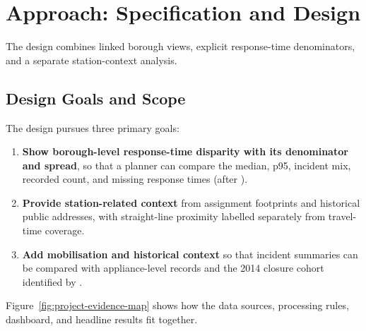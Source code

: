 \section{Approach: Specification and Design}

The design combines linked borough views, explicit response-time denominators, and a separate station-context analysis.

\subsection{Design Goals and Scope}

The design pursues three primary goals:

\begin{enumerate}
    \item \textbf{Show borough-level response-time disparity with its denominator and spread}, so that a planner can compare the median, p95, incident mix, recorded count, and missing response times (after \cite{hullman2015hops, maceachren2012, padilla2018}).
    \item \textbf{Provide station-related context} from assignment footprints and historical public addresses, with straight-line proximity labelled separately from travel-time coverage.
    \item \textbf{Add mobilisation and historical context} so that incident summaries can be compared with appliance-level records and the 2014 closure cohort identified by \cite{spatial2015}.
\end{enumerate}

Figure~\ref{fig:project-evidence-map} shows how the data sources, processing rules, dashboard, and headline results fit together.

